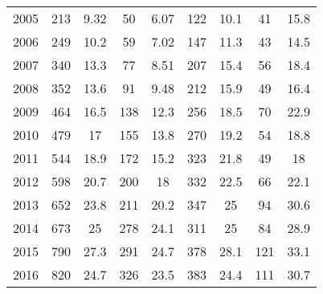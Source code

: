 \begin{table}[htbp]
\begin{tabular}{l*{8}{c}}
2005      &      213&     9.32&       50&     6.07&      122&     10.1&       41&     15.8\\
2006      &      249&     10.2&       59&     7.02&      147&     11.3&       43&     14.5\\
2007      &      340&     13.3&       77&     8.51&      207&     15.4&       56&     18.4\\
2008      &      352&     13.6&       91&     9.48&      212&     15.9&       49&     16.4\\
2009      &      464&     16.5&      138&     12.3&      256&     18.5&       70&     22.9\\
2010      &      479&       17&      155&     13.8&      270&     19.2&       54&     18.8\\
2011      &      544&     18.9&      172&     15.2&      323&     21.8&       49&       18\\
2012      &      598&     20.7&      200&       18&      332&     22.5&       66&     22.1\\
2013      &      652&     23.8&      211&     20.2&      347&       25&       94&     30.6\\
2014      &      673&       25&      278&     24.1&      311&       25&       84&     28.9\\
2015      &      790&     27.3&      291&     24.7&      378&     28.1&      121&     33.1\\
2016      &      820&     24.7&      326&     23.5&      383&     24.4&      111&     30.7\\
\hline\hline
\end{tabular}
\end{table}
